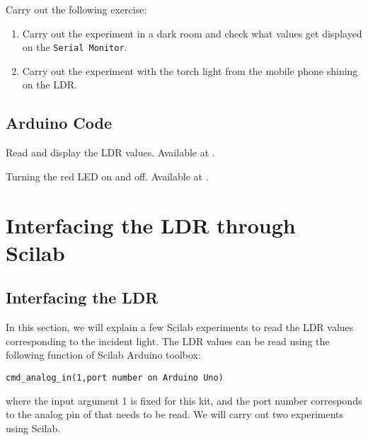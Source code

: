 \begin{exercise}
Carry out the following exercise:
\begin{enumerate}
\item Carry out the experiment in a dark room and check what values
  get displayed on the {\tt Serial Monitor}.
\item Carry out the experiment with the torch light from the mobile
  phone shining on the LDR.
\end{enumerate}
\end{exercise}

\subsection{Arduino Code}
\label{sec:ldr-arduino-code}

\begin{ardcode}
{Read and display the LDR values.  Available at
  .}
\label{ard:ldr-read}

\end{ardcode}

\begin{ardcode}
{Turning the red LED on and off.  Available at
  .}
\label{ard:ldr-led}

\end{ardcode}

\section{Interfacing the LDR through Scilab}
\subsection{Interfacing the LDR}
In this section, we will explain a few Scilab experiments to read the
LDR values corresponding to the incident light. The LDR values can be
read using the following function of Scilab Arduino toolbox:
\begin{lstlisting}[style=nonumbers]
  cmd_analog_in(1,port number on Arduino Uno)
\end{lstlisting}
where the input argument 1 is fixed for this kit, and the port number corresponds to the analog pin of \arduino that needs to be read.  We will carry out two experiments using Scilab.

